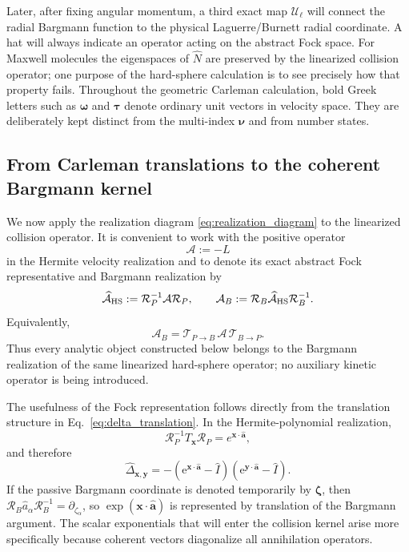 \documentclass[11pt]{article}
\numberwithin{equation}{section}
\newcommand{\e}{\mathrm e}
\theoremstyle{definition}
\begin{document}
Later, after fixing angular momentum, a third exact map
$\mathcal U_\ell$ will connect the radial Bargmann function to the physical
Laguerre/Burnett radial coordinate.
A hat will always indicate an operator acting on the abstract Fock space.  For
Maxwell molecules the eigenspaces of $\widehat N$ are preserved by the
linearized collision operator; one purpose of the hard-sphere calculation is
to see precisely how that property fails.
Throughout the geometric Carleman calculation, bold Greek letters such as
$\bm\omega$ and $\bm\tau$ denote ordinary unit vectors in velocity space.
They are deliberately kept distinct from the multi-index
$\boldsymbol{\nu}$ and from number states.

\subsection{From Carleman translations to the coherent Bargmann kernel}
\label{sec:coherent_bargmann_kernel}

We now apply the realization diagram \eqref{eq:realization_diagram} to the
linearized collision operator.  It is convenient to work with the positive
operator
\begin{equation}
 \mathcal A:=-L
\end{equation}
in the Hermite velocity realization and to denote its exact abstract Fock
representative and Bargmann realization by
\begin{equation}
 \widehat{\mathcal A}_{\rm HS}
 :=
 \mathcal R_P^{-1}\mathcal A\mathcal R_P,
 \qquad
 \mathcal A_B
 :=
 \mathcal R_B\widehat{\mathcal A}_{\rm HS}\mathcal R_B^{-1}.
 \label{eq:A_three_realizations}
\end{equation}
Equivalently,
\begin{equation}
 \mathcal A_B
 =
 \mathcal T_{P\to B}\,\mathcal A\,\mathcal T_{B\to P}.
 \label{eq:A_PB_intertwining}
\end{equation}
Thus every analytic object constructed below belongs to the Bargmann
realization of the same linearized hard-sphere operator; no auxiliary kinetic 
operator is being introduced.

The usefulness of the Fock representation follows directly from the
translation structure in Eq.~\eqref{eq:delta_translation}.  In the
Hermite-polynomial realization,
\begin{equation}
 \mathcal R_P^{-1}T_{\bm x}\mathcal R_P
 =
 e^{\bm x\cdot\hat{\bm a}},
 \label{eq:translation_Fock}
\end{equation}
and therefore
\begin{equation}
 \widehat\Delta_{\bm x,\bm y}
 =
 -
 \left(\e^{\bm x\cdot\hat{\bm a}}-\hat I\right)
 \left(\e^{\bm y\cdot\hat{\bm a}}-\hat I\right).
 \label{eq:Delta_Fock}
\end{equation}
If the passive Bargmann coordinate is denoted temporarily by $\bm\zeta$, then
$\mathcal R_B\hat a_\alpha\mathcal R_B^{-1}=\partial_{\zeta_\alpha}$, so
$\exp(\bm x\cdot\hat{\bm a})$ is represented by translation of the Bargmann
argument.  The scalar exponentials that will enter the collision kernel arise
more specifically because coherent vectors diagonalize all annihilation
operators.
\end{document}
